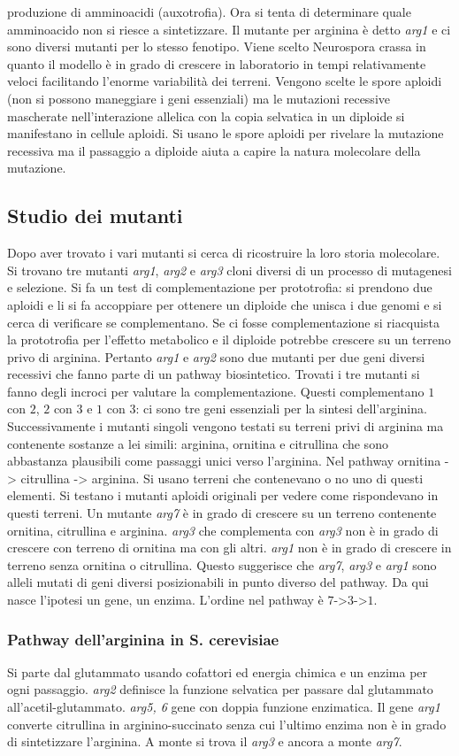 produzione di amminoacidi (auxotrofia). Ora si tenta di determinare quale amminoacido non si riesce a sintetizzare. Il mutante per arginina \`e detto \emph{arg1} e ci sono diversi 
mutanti per lo stesso fenotipo. Viene scelto Neurospora crassa in quanto il modello \`e in grado di crescere in laboratorio in tempi relativamente veloci facilitando l'enorme
variabilit\`a dei terreni. Vengono scelte le spore aploidi (non si possono maneggiare i geni essenziali) ma le mutazioni recessive mascherate nell'interazione allelica con la copia
selvatica in un diploide si manifestano in cellule aploidi. Si usano le spore aploidi per rivelare la mutazione recessiva ma il passaggio a diploide aiuta a capire la natura 
molecolare della mutazione.
\subsection{Studio dei mutanti}
Dopo aver trovato i vari mutanti si cerca di ricostruire la loro storia molecolare. Si trovano tre mutanti \emph{arg1}, \emph{arg2} e \emph{arg3} cloni diversi di un processo di 
mutagenesi e selezione. Si fa un test di complementazione per prototrofia: si prendono due aploidi e li si fa accoppiare per ottenere un diploide che unisca i due genomi e si 
cerca di verificare se complementano. Se ci fosse complementazione si riacquista la prototrofia per l'effetto metabolico e il diploide potrebbe crescere su un terreno privo di 
arginina. Pertanto \emph{arg1} e \emph{arg2} sono due mutanti per due geni diversi recessivi che fanno parte di un pathway biosintetico. Trovati i tre mutanti si fanno degli incroci
per valutare la complementazione. Questi complementano $1$ con $2$, $2$ con $3$ e $1$ con $3$: ci sono tre geni essenziali per la sintesi dell'arginina. Successivamente i mutanti 
singoli vengono testati su terreni privi di arginina ma contenente sostanze a lei simili: arginina, ornitina e citrullina che sono abbastanza plausibili come passaggi unici verso 
l'arginina. Nel pathway ornitina -> citrullina -> arginina. Si usano terreni che contenevano o no uno di questi elementi. Si testano i mutanti aploidi originali per vedere come
rispondevano in questi terreni. Un mutante \emph{arg7} \`e in grado di crescere su un terreno contenente ornitina, citrullina e arginina. \emph{arg3} che complementa con \emph{arg3}
non \`e in grado di crescere con terreno di ornitina ma con gli altri. \emph{arg1} non \`e in grado di crescere in terreno senza ornitina o citrullina. Questo suggerisce che
\emph{arg7}, \emph{arg3} e \emph{arg1} sono alleli mutati di geni diversi posizionabili in punto diverso del pathway. Da qui nasce l'ipotesi un gene, un enzima. L'ordine nel 
pathway \`e $7$->$3$->$1$.
\subsubsection{Pathway dell'arginina in S. cerevisiae}
Si parte dal glutammato usando cofattori ed energia chimica e un enzima per ogni passaggio. \emph{arg2} definisce la funzione selvatica per passare dal glutammato 
all'acetil-glutammato. \emph{arg5, 6} gene con doppia funzione enzimatica. Il gene \emph{arg1} converte citrullina in arginino-succinato senza cui l'ultimo enzima non \`e in grado 
di sintetizzare l'arginina. A monte si trova il \emph{arg3} e ancora a monte \emph{arg7}. 

